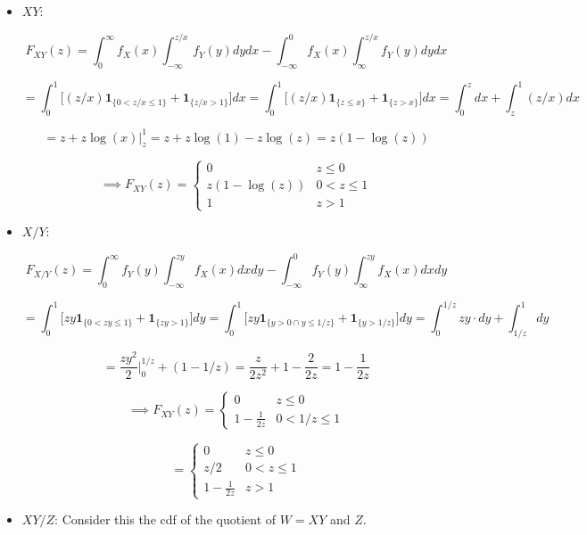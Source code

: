 \begin{itemize}

\item \(XY\):

\[
F_{XY}(z) = \int_0^\infty f_X(x) \int_{-\infty}^{z/x} f_Y(y) dy dx - \int_{-\infty}^0 f_X(x) \int_{\infty}^ {z/x} f_Y(y) dy dx
\]

\[
= \int_0^1  \big[ (z/x) \boldsymbol{1}_{\{0 < z/x \leq 1\}} + \boldsymbol{1}_{\{z/x > 1\}} \big] dx = \int_0^1  \big[ (z/x) \boldsymbol{1}_{\{z \leq x\}} + \boldsymbol{1}_{\{z > x\}} \big] dx = \int_0^z dx + \int_z^1 (z/x) dx
\]

\[
=z + z \log(x) \big|_z^1 = z + z \log(1) - z \log(z) = z (1 - \log(z))
\]

\[
\implies \boxed{ F_{XY}(z) =  \begin{cases} 
     0   &  z \leq 0 \\
     z (1 - \log(z)) & 0 < z \leq 1 \\
   1 & z > 1\end{cases}}
\]

\item \(X/Y\):

\[
F_{X/Y}(z) =\int_0^\infty f_Y(y) \int_{-\infty}^{zy} f_X(x) dx dy - \int_{-\infty}^0 f_Y(y) \int_{\infty}^ {zy} f_X(x) dx dy
\]

\[
= \int_0^1  \big[ zy \boldsymbol{1}_{\{0 < zy \leq 1\}} + \boldsymbol{1}_{\{zy > 1\}} \big] dy = \int_0^1  \big[ zy \boldsymbol{1}_{\{y >0 \cap y \leq 1/z\}} + \boldsymbol{1}_{\{y > 1/z\}} \big] dy = \int_0^{1/z}zy \cdot dy + \int_{1/z}^1 dy
\]

\[
=\frac{zy^2}{2} \bigg|_0^{1/z}+ (1 - 1/z) = \frac{z}{2z^2} + 1 - \frac{2}{2z} = 1 - \frac{1}{2z}
\]

\[
\implies  F_{XY}(z) =  \begin{cases} 
     0   & z \leq 0 \\
     1 - \frac{1}{2z} & 0 < 1/z \leq 1 
     \end{cases}
\]

\[
=  \boxed{ \begin{cases} 
     0   & z \leq 0 \\
     z/2   & 0 < z \leq 1 \\
     1 - \frac{1}{2z} & z > 1
     \end{cases}}
\]

\item \(XY/Z\): Consider this the cdf of the quotient of \(W = XY\) and \(Z\).


\end{itemize}
